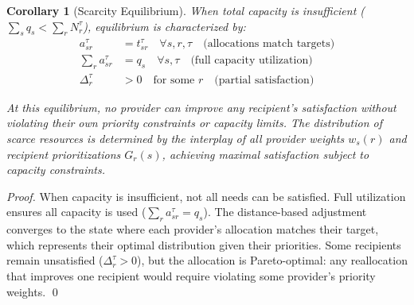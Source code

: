 \documentclass[11pt]{article}
\newtheorem{corollary}{Corollary}
\begin{document}
\begin{corollary}[Scarcity Equilibrium]
\label{cor:scarcity-equilibrium}
When total capacity is insufficient ($\sum_s q_s < \sum_r N_r^\tau$), equilibrium is characterized by:
\begin{align}
a_{sr}^\tau &= t_{sr}^\tau \quad \forall s,r,\tau \quad \text{(allocations match targets)} \\
\sum_r a_{sr}^\tau &= q_s \quad \forall s,\tau \quad \text{(full capacity utilization)} \\
\Delta_r^\tau &> 0 \quad \text{for some } r \quad \text{(partial satisfaction)}
\end{align}

At this equilibrium, no provider can improve any recipient's satisfaction without violating their own priority constraints or capacity limits. The distribution of scarce resources is determined by the interplay of all provider weights $w_s(r)$ and recipient prioritizations $G_r(s)$, achieving maximal satisfaction subject to capacity constraints.
\end{corollary}

\begin{proof}
When capacity is insufficient, not all needs can be satisfied. Full utilization ensures all capacity is used ($\sum_r a_{sr}^\tau = q_s$). The distance-based adjustment converges to the state where each provider's allocation matches their target, which represents their optimal distribution given their priorities. Some recipients remain unsatisfied ($\Delta_r^\tau > 0$), but the allocation is Pareto-optimal: any reallocation that improves one recipient would require violating some provider's priority weights. \qed
\end{proof}
\end{document}
